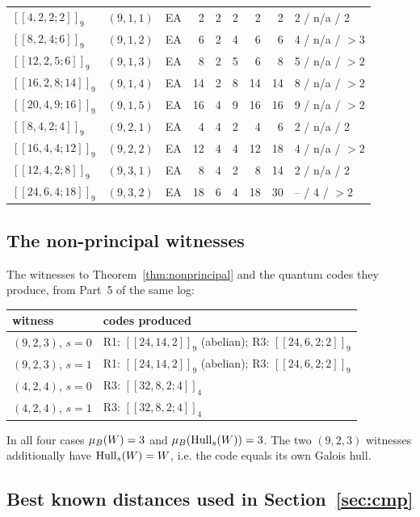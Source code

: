 \begin{table}[h]
\begin{tabular}{@{}llcrrrrrl@{}}
$[[4,2,2;2]]_9$  & $(9,1,1)$ & EA & 2  & 2  & 2  & 2  & 2  & 2 / n/a / 2\\
$[[8,2,4;6]]_9$  & $(9,1,2)$ & EA & 6  & 2  & 4  & 6  & 6  & 4 / n/a / $>3$\\
$[[12,2,5;6]]_9$ & $(9,1,3)$ & EA & 8  & 2  & 5  & 6  & 8  & 5 / n/a / $>2$\\
$[[16,2,8;14]]_9$ & $(9,1,4)$ & EA & 14 & 2  & 8  & 14 & 14 & 8 / n/a / $>2$\\
$[[20,4,9;16]]_9$ & $(9,1,5)$ & EA & 16 & 4  & 9  & 16 & 16 & 9 / n/a / $>2$\\
$[[8,4,2;4]]_9$  & $(9,2,1)$ & EA & 4  & 4  & 2  & 4  & 6  & 2 / n/a / 2\\
$[[16,4,4;12]]_9$ & $(9,2,2)$ & EA & 12 & 4  & 4  & 12 & 18 & 4 / n/a / $>2$\\
$[[12,4,2;8]]_9$ & $(9,3,1)$ & EA & 8  & 4  & 2  & 8  & 14 & 2 / n/a / 2\\
$[[24,6,4;18]]_9$ & $(9,3,2)$ & EA & 18 & 6  & 4  & 18 & 30 & -- / 4 / $>2$\\
\bottomrule
\end{tabular}
\end{table}

\subsection{The non-principal witnesses}

The witnesses to Theorem~\ref{thm:nonprincipal} and the quantum codes they
produce, from Part~5 of the same log:

\begin{center}
\begin{tabular}{@{}ll@{}}
\toprule
witness & codes produced\\\midrule
$(9,2,3)$, $s=0$ & R1: $[[24,14,2]]_9$ (abelian); R3: $[[24,6,2;2]]_9$\\
$(9,2,3)$, $s=1$ & R1: $[[24,14,2]]_9$ (abelian); R3: $[[24,6,2;2]]_9$\\
$(4,2,4)$, $s=0$ & R3: $[[32,8,2;4]]_4$\\
$(4,2,4)$, $s=1$ & R3: $[[32,8,2;4]]_4$\\
\bottomrule
\end{tabular}
\end{center}

In all four cases $\mu_{B}(W)=3$ and $\mu_{B}(\operatorname{Hull}_s(W))=3$. The two
$(9,2,3)$ witnesses additionally have $\operatorname{Hull}_s(W)=W$, i.e. the code equals its
own Galois hull.

\subsection{Best known distances used in Section~\ref{sec:cmp}}

